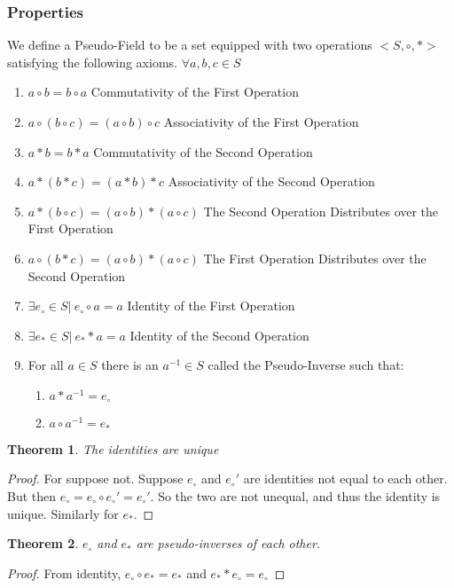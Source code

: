 \documentclass[crop=false,class=book]{standalone}
\theoremstyle{mystyle}
\newtheorem{theorem}{Theorem}[section]
\begin{document}
\subsubsection{Properties}
We define a Pseudo-Field to be a set equipped with two operations $<S,\circ, *>$ satisfying the following axioms.
$\forall a,b,c \in S$
\begin{enumerate}
    \item $a\circ b = b\circ a$ \hfill Commutativity of the First Operation
    \item $a\circ (b\circ c)=(a \circ b)\circ c$ \hfill Associativity of the First Operation
    \item $a*b = b*a$ \hfill Commutativity of the Second Operation
    \item $a*(b*c) = (a*b)*c$ \hfill Associativity of the Second Operation
    \item $a*(b\circ c)=(a\circ b)*(a\circ c)$ \hfill The Second Operation Distributes over the First Operation
    \item $a\circ (b*c) = (a\circ b)*(a\circ c)$ \hfill The First Operation Distributes over the Second Operation
    \item $\exists e_{\circ}\in S|\ e_{\circ}\circ a = a$ \hfill Identity of the First Operation
    \item $\exists e_{*} \in S|\ e_{*}*a = a$ \hfill Identity of the Second Operation
    \item For all $a\in S$ there is an $a^{-1}\in S$ called the Pseudo-Inverse such that:
    \begin{enumerate}
        \item $a*a^{-1} = e_{\circ}$
        \item $a\circ a^{-1}=e_{*}$
    \end{enumerate}
\end{enumerate}
\begin{theorem} The identities are unique
\end{theorem}
\begin{proof} For suppose not. Suppose $e_{\circ}$ and $e_{\circ}'$ are identities not equal to each other. But then $e_{\circ}=e_{\circ}\circ e_{\circ}'=e_{\circ}'$. So the two are not unequal, and thus the identity is unique. Similarly for $e_{*}$.
\end{proof}
\begin{theorem} $e_{\circ}$ and $e_{*}$ are pseudo-inverses of each other.
\end{theorem}
\begin{proof} From identity, $e_{\circ}\circ e_{*}=e_{*}$ and $e_{*}*e_{\circ}=e_{\circ}$
\end{proof}
\end{document}
